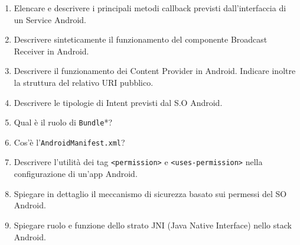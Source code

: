 \documentclass{report}
\begin{document}
\begin{enumerate}
    \item Elencare e descrivere i principali metodi callback previsti dall’interfaccia di un Service Android.
    \item Descrivere sinteticamente il funzionamento del componente Broadcast Receiver in Android.
    \item Descrivere il funzionamento dei Content Provider in Android. Indicare inoltre la struttura del relativo URI pubblico.
    \item Descrivere le tipologie di Intent previsti dal S.O Android.
    \item Qual è il ruolo di \texttt{Bundle}*?
    \item Cos’è l’\texttt{AndroidManifest.xml}?
    \item Descrivere l’utilità dei tag \texttt{<permission>} e \texttt{<uses-permission>} nella configurazione di un'app Android.
    \item Spiegare in dettaglio il meccanismo di sicurezza basato sui permessi del SO Android.
    \item Spiegare ruolo e funzione dello strato JNI (Java Native Interface) nello stack Android.
\end{enumerate}
\end{document}
